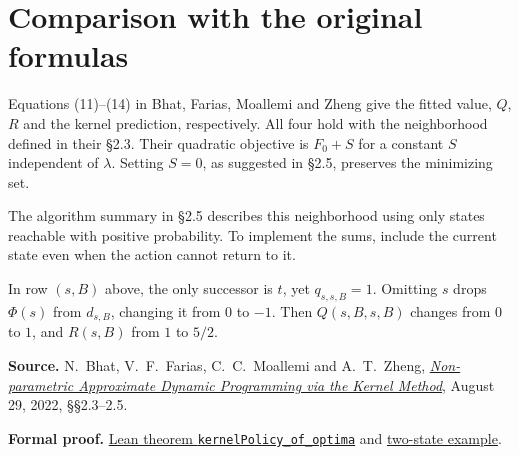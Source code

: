 \documentclass[12pt,a4paper]{article}
\begin{document}
\section*{Comparison with the original formulas}
Equations (11)--(14) in Bhat, Farias, Moallemi and Zheng give the fitted
value, \(Q\), \(R\) and the kernel prediction, respectively. All four
hold with the neighborhood defined in their \S2.3. Their quadratic
objective is \(F_0+S\) for a constant \(S\) independent of \(\lambda\).
Setting \(S=0\), as suggested in \S2.5, preserves the minimizing set.

The algorithm summary
in \S2.5 describes this neighborhood using only states reachable with
positive probability. To implement the sums, include the current state
even when the action cannot return to it.

In row \((s,B)\) above, the only successor is \(t\), yet \(q_{s,s,B}=1\).
Omitting \(s\) drops \(\Phi(s)\) from \(d_{s,B}\), changing it from \(0\)
to \(-1\). Then \(Q(s,B,s,B)\) changes from \(0\) to \(1\), and \(R(s,B)\)
from \(1\) to \(5/2\).

\smallskip
{\small
\textbf{Source.} N.~Bhat, V.~F.~Farias, C.~C.~Moallemi and A.~T.~Zheng,
\href{https://moallemi.com/ciamac/papers/kernel-adp-2012.pdf\#page=7}{\emph{Non-parametric Approximate Dynamic Programming via the Kernel Method}},
August 29, 2022, \S\S2.3--2.5.\par
\textbf{Formal proof.}
\href{https://github.com/nikhilpb/kadp/blob/main/lean/KernelPolicy.lean}{Lean theorem \texttt{kernelPolicy\_of\_optima}}
and \href{https://github.com/nikhilpb/kadp/blob/main/lean/Examples/KernelPolicy.lean}{two-state example}.}
\end{document}
